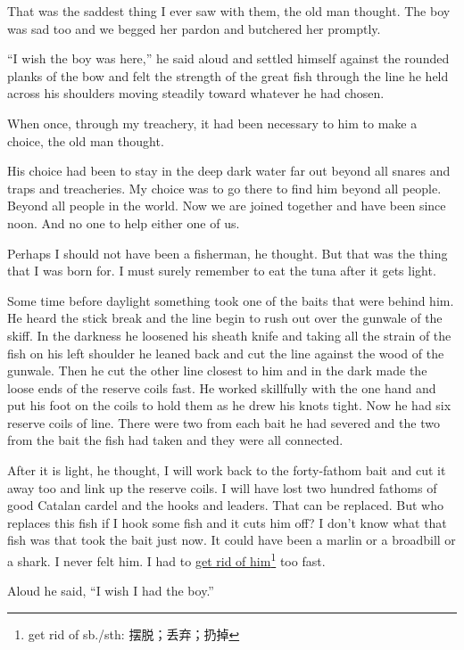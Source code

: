\documentclass[fontset=ubuntu,zihao=-4]{ctexrep}
\begin{document}
That was the saddest thing I ever saw with them, the old man thought. The
boy was sad too and we begged her pardon and butchered her \gls{promptly}.

``I wish the boy was here,'' he said aloud and \gls{settled} himself against
the rounded planks of the bow and felt the strength of the great fish
through the line he held across his shoulders moving steadily toward
whatever he had chosen.

When once, through my \gls{treachery}, it had been necessary to him to make a
choice, the old man thought.

His choice had been to stay in the deep dark water far out \gls{beyond} all
\glspl{snare} and \glspl{trap} and treacheries. My choice was to go
there to find him beyond all people. Beyond all people in the world. Now we
are joined together and have been since noon. And no one to help \gls{either} one
of us.

Perhaps I should not have been a fisherman, he thought. But that was the
thing that I was born for. I must surely remember to eat the tuna after it
gets light.

Some time before daylight something took one of the baits that were behind
him. He heard the stick break and the line begin to rush out over the
\gls{gunwale} of the skiff. In the darkness he \gls{loosened} his
\gls{sheath} knife and taking all the strain of the fish on his left
shoulder he leaned back and cut the line against the wood of the gunwale.
Then he cut the other line closest to him and in the dark made the
\gls{loose} ends of the reserve coils fast. He worked \gls{skillfully} with
the one hand and put his foot on the coils to hold them as he \gls{drew} his
\glspl{knot} tight. Now he had six reserve coils of line. There were two
from each bait he had severed and the two from the bait the fish had taken
and they were all connected.

After it is light, he thought, I will work back to the forty-fathom bait and
cut it away too and link up the reserve coils. I will have lost two hundred
fathoms of good Catalan cardel and the hooks and leaders. That can be
replaced. But who replaces this fish if I hook some fish and it cuts him
off? I don't know what that fish was that took the bait just now. It could
have been a marlin or a broadbill or a shark. I never felt him. I had to \uline{get
rid of him}\footnote{get rid of sb./sth: 摆脱；丢弃；扔掉} too fast.

Aloud he said, ``I wish I had the boy.''
\end{document}
